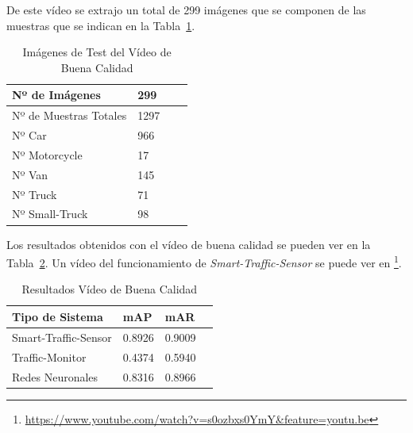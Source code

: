 De este vídeo se extrajo un total de 299 imágenes que se componen de las muestras que se indican en la Tabla~\ref{tabla_video_bueno}.

\begin{table}[H] 
\begin{center}
\begin{tabular}{|l|l|l|l|}
\hline
Nº de Imágenes  & 299 \\
\hline \hline
Nº de Muestras Totales & 1297\\ \hline
Nº Car & 966 \\ \hline
Nº Motorcycle & 17 \\ \hline
Nº Van & 145 \\ \hline
Nº Truck & 71 \\ \hline
Nº Small-Truck & 98 \\ \hline
\end{tabular}
\caption{Imágenes de Test del Vídeo de Buena Calidad}
\label{tabla_video_bueno}
\end{center}
\end{table}

Los resultados obtenidos con el vídeo de buena calidad se pueden ver en la Tabla~\ref{resultados_video_bueno}. Un vídeo del funcionamiento de \textit{Smart-Traffic-Sensor} se puede ver en \footnote{\url{https://www.youtube.com/watch?v=s0ozbxs0YmY&feature=youtu.be}}.

\begin{table}[H] 
\begin{center}
\begin{tabular}{|l|l|l|l|}
\hline
Tipo de Sistema & mAP & mAR  \\ 
\hline \hline
Smart-Traffic-Sensor & 0.8926 & 0.9009 \\ \hline
Traffic-Monitor & 0.4374 & 0.5940 \\ \hline
Redes Neuronales & 0.8316 & 0.8966\\ \hline
\end{tabular}
\caption{Resultados Vídeo de Buena Calidad}
\label{resultados_video_bueno}
\end{center}
\end{table}

